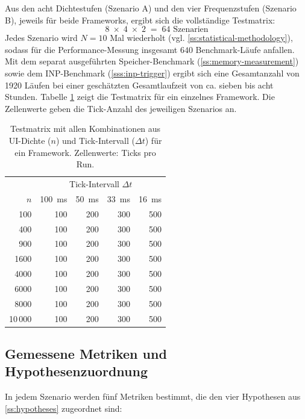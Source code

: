 Aus den acht Dichtestufen (Szenario A) und den vier Frequenzstufen (Szenario B), jeweils für beide Frameworks, ergibt sich die vollständige Testmatrix:
\begin{equation}
	8 \;\times\; 4 \;\times\; 2 \;=\; 64 \text{ Szenarien}
\end{equation}
Jedes Szenario wird $N = 10$ Mal wiederholt (vgl. \cref{ss:statistical-methodology}), sodass für die Performance-Messung insgesamt $640$ Benchmark-Läufe anfallen. Mit dem separat ausgeführten Speicher-Benchmark (\cref{ss:memory-measurement}) sowie dem INP-Benchmark (\cref{sss:inp-trigger}) ergibt sich eine Gesamtanzahl von \num{1920} Läufen bei einer geschätzten Gesamtlaufzeit von ca. sieben bis acht Stunden. Tabelle \ref{tab:test-matrix} zeigt die Testmatrix für ein einzelnes Framework. Die Zellenwerte geben die Tick-Anzahl des jeweiligen Szenarios an.

\begin{table}[htbp]
	\centering
	\caption[Testmatrix (pro Framework)]{Testmatrix mit allen Kombinationen aus UI-Dichte ($n$) und Tick-Intervall ($\Delta t$) für ein Framework. Zellenwerte: Ticks pro Run.}
	\label{tab:test-matrix}
	\begin{tabular}{r|rrrr}
		\hline
		& \multicolumn{4}{c}{Tick-Intervall $\Delta t$} \\
		$n$ & \qty{100}{ms} & \qty{50}{ms} & \qty{33}{ms} & \qty{16}{ms} \\
		\hline
		100   & 100 & 200 & 300 & 500 \\
		400   & 100 & 200 & 300 & 500 \\
		900   & 100 & 200 & 300 & 500 \\
		1600  & 100 & 200 & 300 & 500 \\
		4000  & 100 & 200 & 300 & 500 \\
		6000  & 100 & 200 & 300 & 500 \\
		8000  & 100 & 200 & 300 & 500 \\
		10\,000 & 100 & 200 & 300 & 500 \\
		\hline
	\end{tabular}
\end{table}

\subsection{Gemessene Metriken und Hypothesenzuordnung}
\label{ss:scenario-metrics}

In jedem Szenario werden fünf Metriken bestimmt, die den vier Hypothesen aus \cref{ss:hypotheses} zugeordnet sind:

